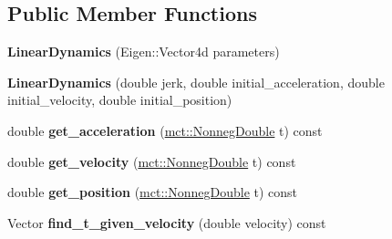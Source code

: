 \subsection*{Public Member Functions}
\begin{DoxyCompactItemize}
\item 
{\bfseries Linear\+Dynamics} (Eigen\+::\+Vector4d parameters)\hypertarget{classmct_1_1LinearDynamics_a4cb41e128efc2d9fda1995610966da86}{}\label{classmct_1_1LinearDynamics_a4cb41e128efc2d9fda1995610966da86}

\item 
{\bfseries Linear\+Dynamics} (double jerk, double initial\+\_\+acceleration, double initial\+\_\+velocity, double initial\+\_\+position)\hypertarget{classmct_1_1LinearDynamics_a5c38619de6412eb2c85bb207fbe6d7ec}{}\label{classmct_1_1LinearDynamics_a5c38619de6412eb2c85bb207fbe6d7ec}

\item 
double {\bfseries get\+\_\+acceleration} (\hyperlink{classmct_1_1NonnegDouble}{mct\+::\+Nonneg\+Double} t) const \hypertarget{classmct_1_1LinearDynamics_a34d6238236aec2a1b30f66edc1e13db9}{}\label{classmct_1_1LinearDynamics_a34d6238236aec2a1b30f66edc1e13db9}

\item 
double {\bfseries get\+\_\+velocity} (\hyperlink{classmct_1_1NonnegDouble}{mct\+::\+Nonneg\+Double} t) const \hypertarget{classmct_1_1LinearDynamics_a0179d2a8a7adfb9280f5238d340e7534}{}\label{classmct_1_1LinearDynamics_a0179d2a8a7adfb9280f5238d340e7534}

\item 
double {\bfseries get\+\_\+position} (\hyperlink{classmct_1_1NonnegDouble}{mct\+::\+Nonneg\+Double} t) const \hypertarget{classmct_1_1LinearDynamics_a8896d67d7d8ecd3676ee1cc54041d03a}{}\label{classmct_1_1LinearDynamics_a8896d67d7d8ecd3676ee1cc54041d03a}

\item 
Vector {\bfseries find\+\_\+t\+\_\+given\+\_\+velocity} (double velocity) const \hypertarget{classmct_1_1LinearDynamics_ae0b39a3139d5f7de01ecbb6e66d85a6e}{}\label{classmct_1_1LinearDynamics_ae0b39a3139d5f7de01ecbb6e66d85a6e}

\end{DoxyCompactItemize}

